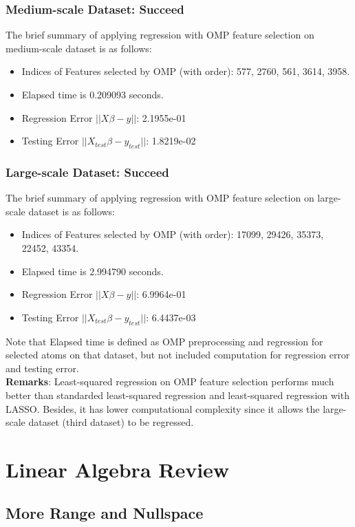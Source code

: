 \documentclass[11pt,a4paper]{report}
\begin{document}
\subsection{Medium-scale Dataset: Succeed}
The brief summary of applying regression with OMP feature selection on
medium-scale dataset is as follows:
\begin{itemize}
\item Indices of Features selected by OMP (with order): 577, 2760, 561, 3614,
    3958. 
\item Elapsed time is 0.209093 seconds.
\item Regression Error $||X \beta - y||$: 2.1955e-01
\item Testing Error $||X_{test} \beta - y_{test}||$: 1.8219e-02
\end{itemize}

\subsection{Large-scale Dataset: Succeed}
The brief summary of applying regression with OMP feature selection on
large-scale dataset is as follows:
\begin{itemize}
\item Indices of Features selected by OMP (with order): 17099, 29426, 35373,
    22452, 43354. 
\item Elapsed time is 2.994790 seconds.
\item Regression Error $||X \beta - y||$: 6.9964e-01
\item Testing Error $||X_{test} \beta - y_{test}||$: 6.4437e-03
\end{itemize}

Note that Elapsed time is defined as OMP preprocessing and regression for
selected atoms on that dataset, but not included computation for regression
error and testing error. 
\\[0.3cm]

\noindent 
{\bf Remarks}: Least-squared regression on OMP feature selection performs much
better than standarded least-squared regression and least-squared regression
with LASSO. Besides, it has lower computational complexity since it allows the
large-scale dataset (third dataset) to be regressed.

\chapter{Linear Algebra Review}
\section{More Range and Nullspace}
\end{document}
